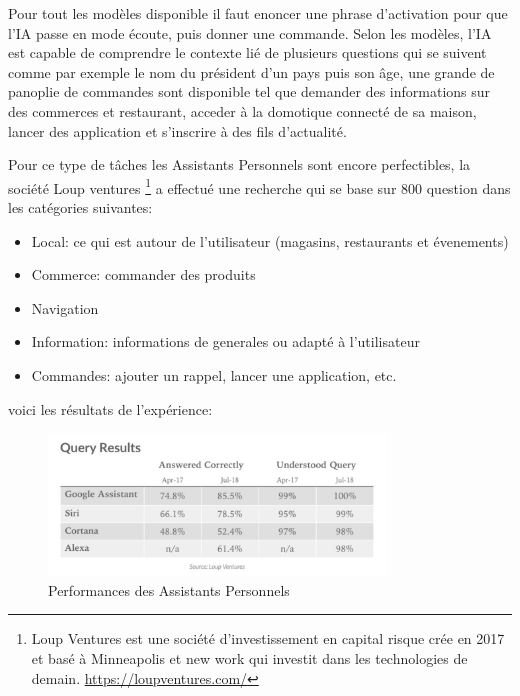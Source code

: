 Pour tout les modèles disponible il faut enoncer une phrase d'activation pour que 
l'IA passe en mode écoute, puis donner une commande. Selon les modèles, l'IA 
est capable de comprendre le contexte lié de plusieurs questions qui se suivent 
comme par exemple le nom du président d'un pays puis son âge, une grande de panoplie de 
commandes sont disponible tel que demander des informations sur des commerces et restaurant,
acceder à la domotique connecté de sa maison, lancer des application et s'inscrire à des fils 
d'actualité. 

Pour ce type de tâches les Assistants Personnels sont encore perfectibles, 
la société Loup ventures
\footnote{ Loup Ventures est une société d'investissement en capital risque crée en 2017 et 
basé à Minneapolis et new work qui investit dans les technologies de demain. \newline
\url{https://loupventures.com/} } 
a effectué une recherche qui se base sur 800 question dans les 
catégories suivantes: \newline

\begin{itemize}
    \item Local: ce qui est autour de l'utilisateur (magasins, restaurants et évenements)
    \item Commerce: commander des produits 
    \item Navigation
    \item Information: informations de generales ou adapté à l'utilisateur 
    \item Commandes: ajouter un rappel, lancer une application, etc. \newline 
\end{itemize}

voici les résultats de l'expérience:
\begin{figure}[h]
    \centering
    \includegraphics[width=0.8\textwidth]{Images/vaqueryresult}
    \caption{Performances des Assistants Personnels}
    \label{fig:virtualassistantqueryresult}
\end{figure}

